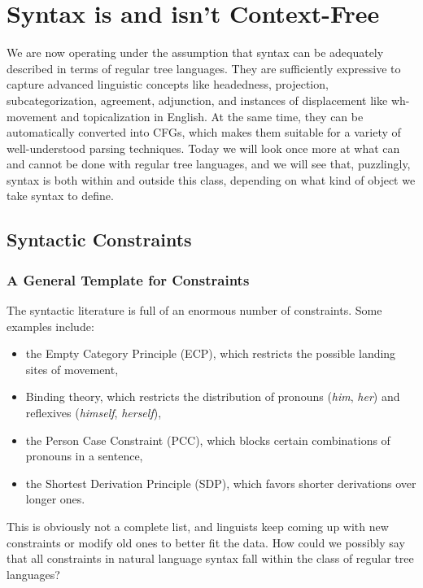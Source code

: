 \chapter{Syntax is and isn't Context-Free}
\label{cha:MCS}

We are now operating under the assumption that syntax can be adequately described in terms of regular tree languages.
They are sufficiently expressive to capture advanced linguistic concepts like headedness, projection, subcategorization, agreement, adjunction, and instances of displacement like wh-movement and topicalization in English.
At the same time, they can be automatically converted into CFGs, which makes them suitable for a variety of well-understood parsing techniques.
Today we will look once more at what can and cannot be done with regular tree languages, and we will see that, puzzlingly, syntax is both within and outside this class, depending on what kind of object we take syntax to define.

\section{Syntactic Constraints}

\subsection{A General Template for Constraints}
The syntactic literature is full of an enormous number of constraints.
Some examples include:
%
\begin{itemize}
    \item the Empty Category Principle (ECP), which restricts the possible landing sites of movement,
    \item Binding theory, which restricts the distribution of pronouns (\emph{him}, \emph{her}) and reflexives (\emph{himself}, \emph{herself}),
    \item the Person Case Constraint (PCC), which blocks certain combinations of pronouns in a sentence,
    \item the Shortest Derivation Principle (SDP), which favors shorter derivations over longer ones.
\end{itemize}
%
This is obviously not a complete list, and linguists keep coming up with new constraints or modify old ones to better fit the data.
How could we possibly say that all constraints in natural language syntax fall within the class of regular tree languages?

